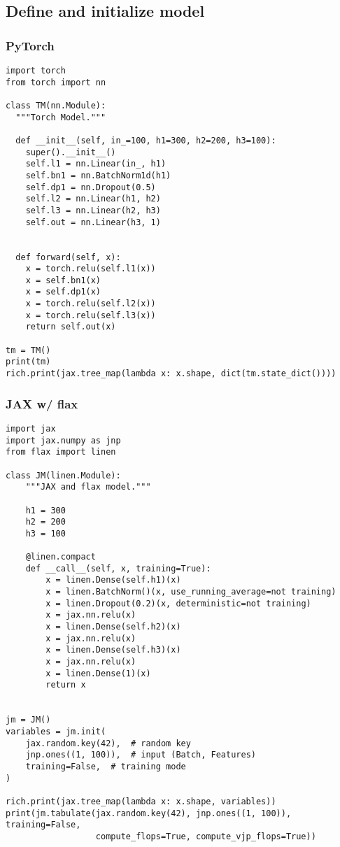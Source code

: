 \documentclass[11pt]{article}
\begin{document}
\subsection{Define and initialize model}
\label{sec:org874c6d3}

\subsubsection{PyTorch}
\label{sec:orgc788179}

\begin{verbatim}
import torch
from torch import nn

class TM(nn.Module):
  """Torch Model."""

  def __init__(self, in_=100, h1=300, h2=200, h3=100):
    super().__init__()
    self.l1 = nn.Linear(in_, h1)
    self.bn1 = nn.BatchNorm1d(h1)
    self.dp1 = nn.Dropout(0.5)
    self.l2 = nn.Linear(h1, h2)
    self.l3 = nn.Linear(h2, h3)
    self.out = nn.Linear(h3, 1)


  def forward(self, x):
    x = torch.relu(self.l1(x))
    x = self.bn1(x)
    x = self.dp1(x)
    x = torch.relu(self.l2(x))
    x = torch.relu(self.l3(x))
    return self.out(x)

tm = TM()
print(tm)
rich.print(jax.tree_map(lambda x: x.shape, dict(tm.state_dict())))
\end{verbatim}
\subsubsection{JAX w/ flax}
\label{sec:org91228eb}

\begin{verbatim}
import jax
import jax.numpy as jnp
from flax import linen

class JM(linen.Module):
    """JAX and flax model."""

    h1 = 300
    h2 = 200
    h3 = 100

    @linen.compact
    def __call__(self, x, training=True):
        x = linen.Dense(self.h1)(x)
        x = linen.BatchNorm()(x, use_running_average=not training)
        x = linen.Dropout(0.2)(x, deterministic=not training)
        x = jax.nn.relu(x)
        x = linen.Dense(self.h2)(x)
        x = jax.nn.relu(x)
        x = linen.Dense(self.h3)(x)
        x = jax.nn.relu(x)
        x = linen.Dense(1)(x)
        return x


jm = JM()
variables = jm.init(
    jax.random.key(42),  # random key
    jnp.ones((1, 100)),  # input (Batch, Features)
    training=False,  # training mode
)

rich.print(jax.tree_map(lambda x: x.shape, variables))
print(jm.tabulate(jax.random.key(42), jnp.ones((1, 100)), training=False,
                  compute_flops=True, compute_vjp_flops=True))
\end{verbatim}
\end{document}
